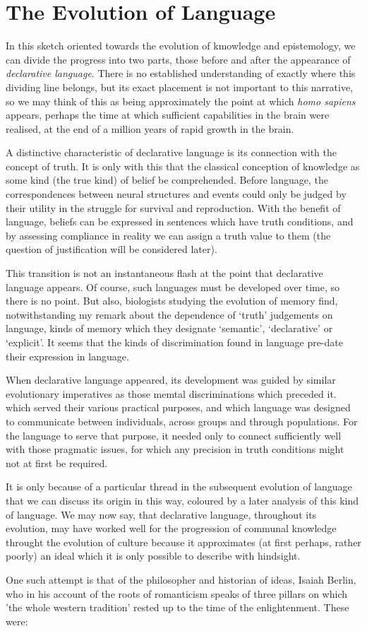 \section{The Evolution of Language}

In this sketch oriented towards the evolution of kmowledge and epistemology, we can divide the progress into two parts, those before and after the appearance of \emph{declarative language}.
There is no established understanding of exactly where this dividing line belongs, but its exact placement is not important to this narrative, so we may think of this as being approximately the point at which \emph{homo sapiens} appears, perhaps the time at which sufficient capabilities in the brain were realised, at the end of a million years of rapid growth in the brain.

A distinctive characteristic of declarative language is its connection with the concept of truth.
It is only with this that the classical conception of knowledge as some kind (the true kind)  of belief be comprehended.
Before language, the correspondences between neural structures and events could only be judged by their utility in the struggle for survival and reproduction.
With the benefit of language, beliefs can be expressed in sentences which have truth conditions, and by assessing compliance in reality we can assign a truth value to them (the question of justification will be considered later).

This transition is not an instantaneous flash at the point that declarative language appears.
Of course, such languages must be developed over time, so there is no point.
But also, biologists studying the evolution of memory find, notwithstanding my remark about the dependence of `truth' judgements on language, kinds of memory which they designate `semantic', `declarative' or `explicit'.
It seems that the kinds of discrimination found in language pre-date their expression in language.

When declarative language appeared, its development was guided by similar evolutionary imperatives as those memtal discriminations which preceded it. which served their various practical purposes, and which language was designed to communicate between individuals, across groups and through populations.
For the language to serve that purpose, it needed only to connect sufficiently well with those pragmatic issues, for which any precision in truth conditions might not at first be required.

It is only because of a particular thread in the subsequent evolution of language that we can discuss its origin in this way, coloured by a later analysis of this kind of language.
We may now say, that declarative language, throughout its evolution, may have worked well for the progression of communal knowledge throught the evolution of culture because it approximates (at first perhaps, rather poorly) an ideal which it is only possible to describe with hindsight.

One such attempt is that of the philosopher and historian of ideas, Isaiah Berlin, who in his account of the roots of romanticism speaks of three pillars on which 'the whole western tradition' rested up to the time of the enlightenment.
These were:
